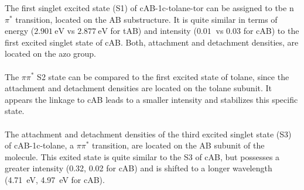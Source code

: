 %
%
\begin{comment}
Table \ref{tab:excited_states_cAB_1c_tolane} contains the wavelength, energy and oscillator strength of the six energetically lowest excited states of cAB-1c-tolane which are plotted in figure \ref{fig:UV_spec_cAB-for-tAB-1c-tolan} in relation to a combined UV spectrum of cAB and tolane. \\
\\  
\end{comment}
%
The first singlet excited state (S1) of cAB-1c-tolane-tor can be assigned to tbe n$\pi^*$ transition, located on the AB substructure.
It is quite similar in terms of energy ($\SI{2.901}{\eV}$ vs $\SI{2.877}{\eV}$ for tAB) and intensity ($\SI{0.01}{}$ vs $0.03$ for cAB) to the first excited singlet state of cAB.
Both, attachment and detachment densities, are located on the azo group.\\
%
%
%
\\
The $\pi\pi^{*}$ S2 state can be compared to the first excited state of tolane, since the attachment and detachment densities are located on the tolane subunit.
It appears the linkage to cAB leads to a smaller intensity and stabilizes this specific state. \\
\\
The attachment and detachment densities of the third excited singlet state (S3) of cAB-1c-tolane, a $\pi\pi^{*}$ transition, are located on the AB subunit of the molecule.
This exited state is quite similar to the S3 of cAB, but possesses a greater intensity (0.32, 0.02 for cAB) and is shifted to a longer wavelength (\SI[]{4.71}{\electronvolt}, \SI[]{4.97}{\electronvolt} for cAB).\\
\\
